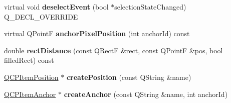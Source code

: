 \begin{DoxyCompactItemize}
\item 
virtual void {\bfseries deselect\+Event} (bool $\ast$selection\+State\+Changed) Q\+\_\+\+D\+E\+C\+L\+\_\+\+O\+V\+E\+R\+R\+I\+DE\hypertarget{class_q_c_p_abstract_item_ac6257547cbfde82121c396d9ed1951af}{}\label{class_q_c_p_abstract_item_ac6257547cbfde82121c396d9ed1951af}

\item 
virtual Q\+PointF {\bfseries anchor\+Pixel\+Position} (int anchor\+Id) const \hypertarget{class_q_c_p_abstract_item_a839bfda44ef66c89e29a955dcb581be4}{}\label{class_q_c_p_abstract_item_a839bfda44ef66c89e29a955dcb581be4}

\item 
double {\bfseries rect\+Distance} (const Q\+RectF \&rect, const Q\+PointF \&pos, bool filled\+Rect) const \hypertarget{class_q_c_p_abstract_item_a57cf4b9cecbfeb5f9e267481ecfe10cd}{}\label{class_q_c_p_abstract_item_a57cf4b9cecbfeb5f9e267481ecfe10cd}

\item 
\hyperlink{class_q_c_p_item_position}{Q\+C\+P\+Item\+Position} $\ast$ {\bfseries create\+Position} (const Q\+String \&name)\hypertarget{class_q_c_p_abstract_item_aa77c2a99c9aa91a9128308f4388446fa}{}\label{class_q_c_p_abstract_item_aa77c2a99c9aa91a9128308f4388446fa}

\item 
\hyperlink{class_q_c_p_item_anchor}{Q\+C\+P\+Item\+Anchor} $\ast$ {\bfseries create\+Anchor} (const Q\+String \&name, int anchor\+Id)\hypertarget{class_q_c_p_abstract_item_a923b24e112879e10ca6eb90d3499c1da}{}\label{class_q_c_p_abstract_item_a923b24e112879e10ca6eb90d3499c1da}

\end{DoxyCompactItemize}
